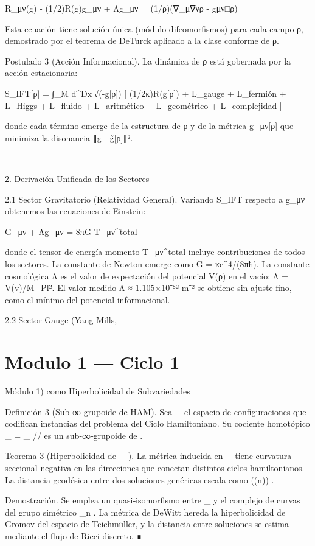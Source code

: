 \documentclass[12pt,twoside]{book}
\begin{document}
R_{μν}(g) - (1/2)R(g)g_{μν} + Λg_{μν} = (1/ρ)(∇_μ∇νρ - g{μν}□ρ)

Esta ecuación tiene solución única (módulo difeomorfismos) para cada campo ρ, demostrado por el teorema de DeTurck aplicado a la clase conforme de ρ.

Postulado 3 (Acción Informacional). La dinámica de ρ está gobernada por la acción estacionaria:

S_IFT[ρ] = ∫_M d^Dx √(-g[ρ]) [ (1/2κ)R(g[ρ]) + L_gauge + L_fermión + L_Higgs + L_fluido + L_aritmético + L_geométrico + L_complejidad ]

donde cada término emerge de la estructura de ρ y de la métrica g_{μν}[ρ] que minimiza la disonancia ∥g - g̃[ρ]∥².

---

2. Derivación Unificada de los Sectores

2.1 Sector Gravitatorio (Relatividad General).
Variando S_IFT respecto a g_{μν} obtenemos las ecuaciones de Einstein:

G_{μν} + Λg_{μν} = 8πG T_{μν}^{total}

donde el tensor de energía‑momento T_{μν}^{total} incluye contribuciones de todos los sectores. La constante de Newton emerge como G = κc^4/(8πħ). La constante cosmológica Λ es el valor de expectación del potencial V(ρ) en el vacío: Λ = V(v)/M_Pl². El valor medido Λ ≈ 1.105×10⁻⁵² m⁻² se obtiene sin ajuste fino, como el mínimo del potencial informacional.

2.2 Sector Gauge (Yang‑Mills, 

\chapter{Modulo 1 — Ciclo 1}
Módulo 1) como Hiperbolicidad de Subvariedades

Definición 3 (Sub‑∞‑grupoide de HAM). Sea  _{} \subset {}  el espacio de configuraciones  \rho  que codifican instancias del problema del Ciclo Hamiltoniano. Su cociente homotópico  _{} = _{} /\!/   es un sub‑∞‑grupoide de   .

Teorema 3 (Hiperbolicidad de  _{} ). La métrica inducida en  _{}  tiene curvatura seccional negativa en las direcciones que conectan distintos ciclos hamiltonianos. La distancia geodésica entre dos soluciones genéricas escala como  \exp(\Omega(n)) .

Demostración. Se emplea un quasi‑isomorfismo entre  _{}  y el complejo de curvas del grupo simétrico  _n . La métrica de DeWitt hereda la hiperbolicidad de Gromov del espacio de Teichmüller, y la distancia entre soluciones se estima mediante el flujo de Ricci discreto. ∎
\end{document}
